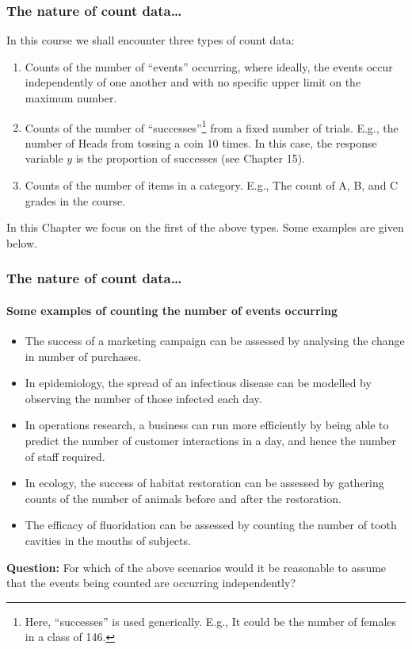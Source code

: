\documentclass{beamer}\usepackage[]{graphicx}\usepackage[]{xcolor}
\begin{document}
\begin{frame}[fragile]
\frametitle{The nature of count data\ldots}
In this course we shall encounter three types of count data:
\bigskip

\begin{enumerate}
  \item Counts of the number of ``events'' occurring, where ideally, the events occur independently of one another and with no specific upper limit on the maximum number.
  \item Counts of the number of ``successes''\footnote{Here, ``successes'' is used generically. E.g., It could be the number of females in a class of 146.} from a fixed number of trials. E.g., the number of Heads from tossing a coin 10 times. In this case, the response variable $y$ is the proportion of successes (see Chapter 15).
  \item Counts of the number of items in a category. E.g., The count of A, B, and C grades in the course.
\end{enumerate}
\bigskip

In this Chapter we focus on the first of the above types. Some examples are given below.
\end{frame}



\begin{frame}[fragile]
\frametitle{The nature of count data\ldots}
\framesubtitle{Some examples of counting the number of events occurring}
\begin{itemize}
\item The success of a marketing campaign can be assessed by analysing the change in
number of purchases.
\item In epidemiology, the spread of an infectious disease can be modelled by observing
the number of those infected each day.
\item In operations research, a business can run more efficiently by being able to predict the number of customer interactions in a day,
and hence the number of staff required.
\item In ecology, the success of habitat restoration can be assessed by gathering counts
of the number of animals before and after the restoration.
\item The efficacy of fluoridation can be assessed by counting the number of tooth cavities
in the mouths of subjects.
\end{itemize}
\bigskip

{\bf Question:} For which of the above scenarios would it be reasonable to assume that the events being counted are occurring independently?
\end{frame}
\end{document}
